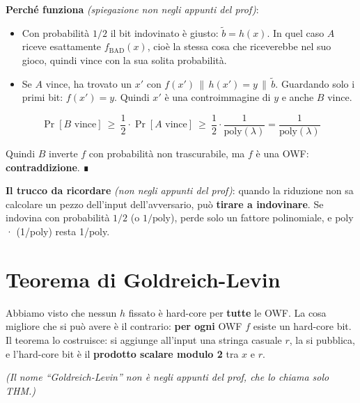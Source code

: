 \textbf{Perché funziona} \emph{(spiegazione non negli appunti del prof)}:

\begin{itemize}
\tightlist
\item
  Con probabilità \(1/2\) il bit indovinato è giusto: \(\tilde{b} = h(x)\). In quel caso \(A\) riceve esattamente \(f_{\text{BAD}}(x)\), cioè la stessa cosa che riceverebbe nel suo gioco, quindi vince con la sua solita probabilità.
\item
  Se \(A\) vince, ha trovato un \(x'\) con \(f(x') \,\|\, h(x') = y \,\|\, \tilde{b}\). Guardando solo i primi bit: \(f(x') = y\). Quindi \(x'\) è una controimmagine di \(y\) e anche \(B\) vince.
\end{itemize}

\[
\Pr[B \text{ vince}] \ \ge\ \frac{1}{2} \cdot \Pr[A \text{ vince}] \ \ge\ \frac{1}{2} \cdot \frac{1}{\text{poly}(\lambda)} = \frac{1}{\text{poly}(\lambda)}
\]

Quindi \(B\) inverte \(f\) con probabilità non trascurabile, ma \(f\) è una OWF: \textbf{contraddizione}. ∎

\begin{nota}

\textbf{Il trucco da ricordare} \emph{(non negli appunti del prof)}: quando la riduzione non sa calcolare un pezzo dell'input dell'avversario, può \textbf{tirare a indovinare}. Se indovina con probabilità \(1/2\) (o \(1/\text{poly}\)), perde solo un fattore polinomiale, e poly · (1/poly) resta 1/poly.

\end{nota}

\section{Teorema di Goldreich-Levin}

\begin{inbreve}

Abbiamo visto che nessun \(h\) fissato è hard-core per \textbf{tutte} le OWF. La cosa migliore che si può avere è il contrario: \textbf{per ogni} OWF \(f\) esiste un hard-core bit. Il teorema lo costruisce: si aggiunge all'input una stringa casuale \(r\), la si pubblica, e l'hard-core bit è il \textbf{prodotto scalare modulo 2} tra \(x\) e \(r\).

\end{inbreve}

\emph{(Il nome ``Goldreich-Levin'' non è negli appunti del prof, che lo chiama solo THM.)}

